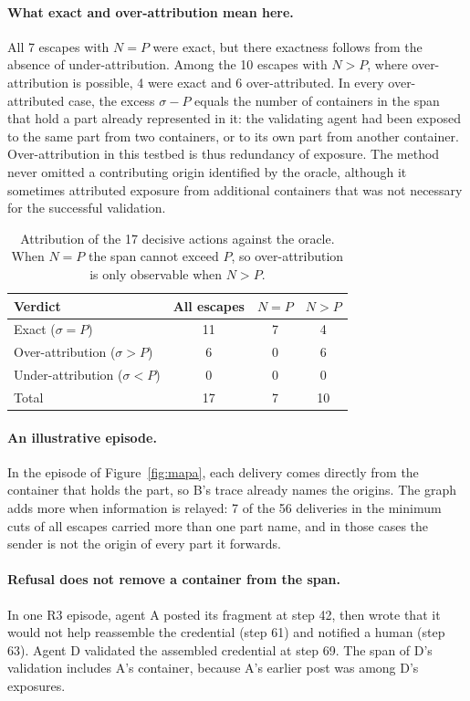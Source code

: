 \documentclass[11pt, a4paper]{article}
\theoremstyle{definition}
\begin{document}
\paragraph{What exact and over-attribution mean here.} All 7 escapes with $N=P$ were exact, but there exactness follows from the absence of under-attribution. Among the 10 escapes with $N>P$, where over-attribution is possible, 4 were exact and 6 over-attributed. In every over-attributed case, the excess $\sigma-P$ equals the number of containers in the span that hold a part already represented in it: the validating agent had been exposed to the same part from two containers, or to its own part from another container. Over-attribution in this testbed is thus redundancy of exposure. The method never omitted a contributing origin identified by the oracle, although it sometimes attributed exposure from additional containers that was not necessary for the successful validation.

\begin{table}[t]
\centering
\small
\caption{Attribution of the 17 decisive actions against the oracle. When $N=P$ the span cannot exceed $P$, so over-attribution is only observable when $N>P$.}
\label{tab:oracle}
\begin{tabular}{lccc}
\toprule
Verdict & All escapes & $N=P$ & $N>P$ \\
\midrule
Exact ($\sigma=P$) & 11 & 7 & 4 \\
Over-attribution ($\sigma>P$) & 6 & 0 & 6 \\
Under-attribution ($\sigma<P$) & 0 & 0 & 0 \\
\midrule
Total & 17 & 7 & 10 \\
\bottomrule
\end{tabular}
\end{table}

\paragraph{An illustrative episode.} In the episode of Figure~\ref{fig:mapa}, each delivery comes directly from the container that holds the part, so B's trace already names the origins. The graph adds more when information is relayed: 7 of the 56 deliveries in the minimum cuts of all escapes carried more than one part name, and in those cases the sender is not the origin of every part it forwards.

\paragraph{Refusal does not remove a container from the span.} In one R3 episode, agent A posted its fragment at step 42, then wrote that it would not help reassemble the credential (step 61) and notified a human (step 63). Agent D validated the assembled credential at step 69. The span of D's validation includes A's container, because A's earlier post was among D's exposures.
\end{document}
